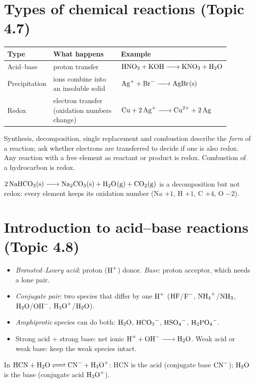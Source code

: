 \documentclass[11pt]{article}
\begin{document}
\section{Types of chemical reactions (Topic 4.7)}\label{t:4.7}
\begin{center}
\begin{tabular}{p{0.2\linewidth}p{0.36\linewidth}p{0.34\linewidth}}\toprule
Type & What happens & Example \\ \midrule
Acid--base & proton transfer & $\ce{HNO3 + KOH -> KNO3 + H2O}$ \\
Precipitation & ions combine into an insoluble solid & $\ce{Ag+ + Br- -> AgBr(s)}$ \\
Redox & electron transfer (oxidation numbers change) & $\ce{Cu + 2Ag+ -> Cu^2+ + 2Ag}$ \\ \bottomrule
\end{tabular}
\end{center}
Synthesis, decomposition, single replacement and combustion describe the \emph{form} of a reaction; ask whether electrons are transferred to decide if one is also redox. Any reaction with a free element as reactant or product is redox. Combustion of a hydrocarbon is redox.

 $\ce{2NaHCO3(s) -> Na2CO3(s) + H2O(g) + CO2(g)}$ is a decomposition but not redox: every element keeps its oxidation number (Na $+1$, H $+1$, C $+4$, O $-2$).

\section{Introduction to acid--base reactions (Topic 4.8)}\label{t:4.8}
\begin{itemize}
\item \emph{Brønsted--Lowry acid}: proton ($\ce{H+}$) donor. \emph{Base}: proton acceptor, which needs a lone pair.
\item \emph{Conjugate pair}: two species that differ by one $\ce{H+}$ ($\ce{HF}$/$\ce{F-}$, $\ce{NH4+}$/$\ce{NH3}$, $\ce{H2O}$/$\ce{OH-}$, $\ce{H3O+}$/$\ce{H2O}$).
\item \emph{Amphiprotic} species can do both: $\ce{H2O}$, $\ce{HCO3-}$, $\ce{HSO4-}$, $\ce{H2PO4-}$.
\item Strong acid + strong base: net ionic $\ce{H+ + OH- -> H2O}$. Weak acid or weak base: keep the weak species intact.
\end{itemize}
 In $\ce{HCN + H2O <=> CN- + H3O+}$: HCN is the acid (conjugate base $\ce{CN-}$); $\ce{H2O}$ is the base (conjugate acid $\ce{H3O+}$).
\end{document}
